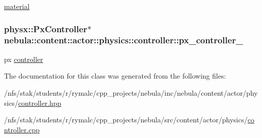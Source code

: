 \hyperlink{classnebula_1_1content_1_1actor_1_1physics_1_1material}{material} \hypertarget{classnebula_1_1content_1_1actor_1_1physics_1_1controller_aba11f4ca929373b52f513b6b6309446a}{
\subsubsection[{px\_\-controller\_\-}]{\setlength{\rightskip}{0pt plus 5cm}physx::PxController$\ast$ {\bf nebula::content::actor::physics::controller::px\_\-controller\_\-}}}
\label{classnebula_1_1content_1_1actor_1_1physics_1_1controller_aba11f4ca929373b52f513b6b6309446a}


px \hyperlink{classnebula_1_1content_1_1actor_1_1physics_1_1controller}{controller} 

The documentation for this class was generated from the following files:\begin{DoxyCompactItemize}
\item 
/nfs/stak/students/r/rymalc/cpp\_\-projects/nebula/inc/nebula/content/actor/physics/\hyperlink{physics_2controller_8hpp}{controller.hpp}\item 
/nfs/stak/students/r/rymalc/cpp\_\-projects/nebula/src/content/actor/physics/\hyperlink{physics_2controller_8cpp}{controller.cpp}\end{DoxyCompactItemize}
